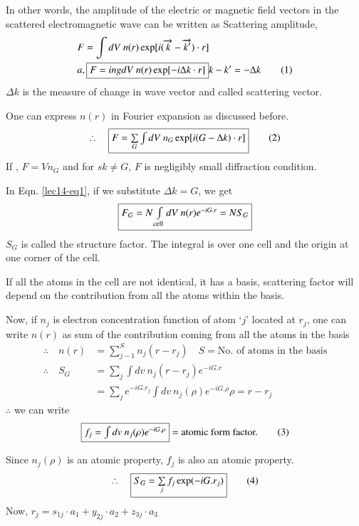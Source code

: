 In other words, the amplitude of the electric or magnetic field vectors in the scattered electromagnetic wave can be written as Scattering amplitude,
\begin{align*}
& F=\int dV \ n(r)\exp [i(\overrightarrow{k}-\overrightarrow{k'})\cdot r]\\
& a, \fbox{$F=ing dV \ n(r) \exp [-i\Delta k\cdot r]$}k-k'=-\Delta k\tag{1}\label{lec14-eq1}
\end{align*}
$\Delta k$ is the measure of change in wave vector and called scattering vector.

One can express $n(r)$ in Fourier expansion as discussed before.
\begin{equation*}
\therefore\quad \fbox{$F=\sum\limits_{G}\int dV \ n_{G}\exp [i(G-\Delta k)\cdot r]$}\tag{2}\label{lec14-eq2}
\end{equation*}
If ,  $F=Vn_{G}$ and for $sk\neq G$, $F$ is negligibly small diffraction condition.

In Eqn. \eqref{lec14-eq1}, if we substitute $\Delta k=G$, we get
$$
\fbox{$F_{G}=N\int\limits_{\text{cell}}dV \ n(r)e^{-iG.r}=NS_{G}$}
$$
$S_{G}$ is called the structure factor. The integral is over one cell and the origin at one corner of the cell.

If all the atoms in the cell are not identical, it has a basis, scattering factor will depend on the contribution from all the atoms within the basis.

Now, if $n_{j}$ is electron concentration function of atom `$j$' located at $r_{j}$, one can write $n(r)$ as sum of the contribution coming from all the atoms in the basis
\begin{align*}
\therefore\quad n(r) &= \sum\limits^{S}_{j-1}n_{j}(r-r_{j})\quad S=\text{No. of atoms in the basis}\\
\therefore\quad S_{G} &= \sum\limits_{j}\int dv \ n_{j}(r-r_{j})e^{-iG.r}\\
&= \sum\limits_{j}e^{-iG.r_{j}}\int dv \ n_{j}(\rho)e^{-iG.\rho}\rho=r-r_{j}
\end{align*}
$\therefore$ we can write
\begin{equation*}
\fbox{$f_{j}=\int dv \ n_{j}(\rho)e^{-iG.\rho}$}=\text{atomic form factor.}\tag{3}\label{lec14-eq3}
\end{equation*}

Since $n_{j}(\rho)$ is an atomic property, $f_{j}$ is also an atomic property.
\begin{equation*}
\therefore\quad \fbox{$S_{G}=\sum\limits_{j}f_{j}\exp (-iG.r_{j})$}\tag{4}\label{lec14-eq4}
\end{equation*}
Now, $r_{j}=s_{1j}\cdot a_{1}+y_{2j}\cdot a_{2}+z_{3j}\cdot a_{3}$

